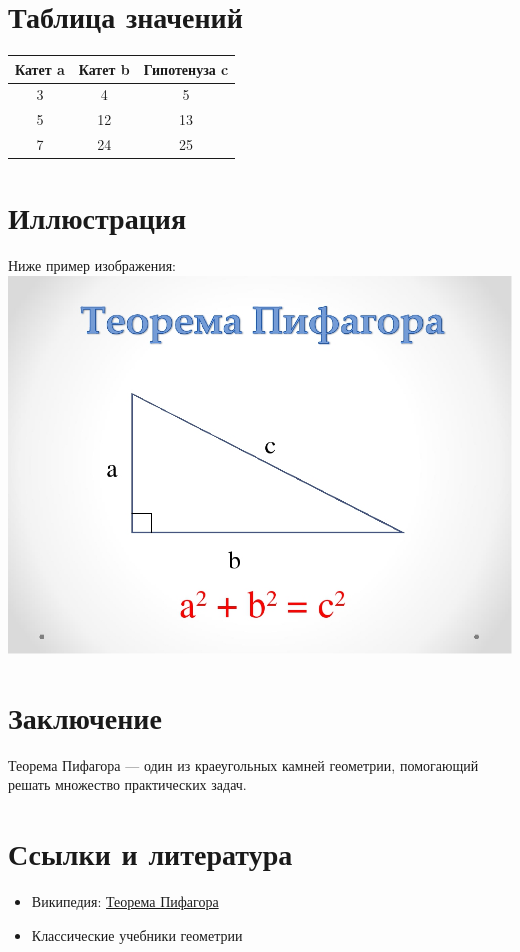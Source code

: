 \documentclass{article}
\begin{document}
\section{Таблица значений}
\begin{center}
\begin{tabular}{|c|c|c|}
\hline
Катет a & Катет b & Гипотенуза c \\
\hline
3 & 4 & 5 \\
\hline
5 & 12 & 13 \\
\hline
7 & 24 & 25 \\
\hline
\end{tabular}
\end{center}
\section{Иллюстрация}
\newline Ниже пример изображения:
\newline 
\includegraphics[width=0.5\linewidth]{img5.jpg}
\section{Заключение}
\newline Теорема Пифагора — один из краеугольных камней геометрии, помогающий решать
 множество практических задач.
\section{Ссылки и литература}
\begin{itemize}
    \item Википедия: \href{https://ru.wikipedia.org/wiki/%D0%A2%D0%B5%D0%BE%D1%80%D0%B5%D0%BC%D0%B0_%D0%9F%D0%B8%D1%84%D0%B0%D0%B3%D0%BE%D1%80%D0%B0}{Теорема Пифагора}
    \item Классические учебники геометрии
\end{itemize}
\newpage 
\end{document}

